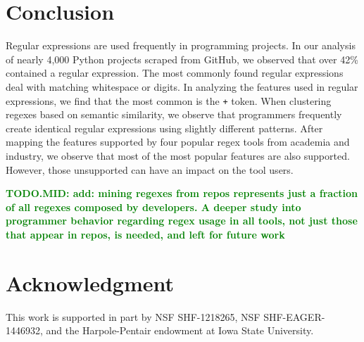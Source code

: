 \documentclass{sig-alternate}
\newcommand{\todoMid}[1]{\textbf{\textcolor{green}{TODO.MID: #1}}} %
\begin{document}
\section{Conclusion}
\label{sec:conclusion}
Regular expressions are used frequently in programming projects. In our analysis of nearly 4,000 Python projects scraped from GitHub, we observed that over 42\% contained a regular expression. The most commonly found regular expressions deal with matching whitespace or digits.
In analyzing the features used in regular expressions, we find that the most common is the {\tt +} token.
When clustering regexes based on semantic similarity, we observe that programmers frequently create identical regular expressions using slightly different patterns. After mapping the features supported by four popular regex tools from academia and industry, we observe that most of the most popular features are also supported. However, those  unsupported can have an impact on the tool users.

\todoMid{add: mining regexes from repos represents just a fraction of all regexes composed by developers. A deeper study into programmer behavior regarding regex usage in all tools, not just those that appear in repos, is needed, and left for future work}

\section*{Acknowledgment}
This work is supported in part by NSF SHF-1218265, NSF SHF-EAGER-1446932, and the Harpole-Pentair endowment at Iowa State University.




\balance




\end{document}
